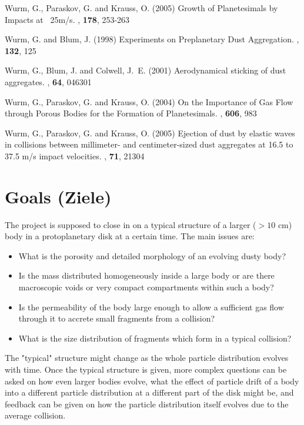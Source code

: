 \begin{ownpubl}
\item Wurm, G., Paraskov, G. and Krauss, O. (2005) Growth of
Planetesimals by Impacts at ~25m/s. \ica, \textbf{178}, 253-263

\item Wurm, G. and Blum, J. (1998) Experiments on Preplanetary
Dust Aggregation. \ica, \textbf{132}, 125

\item Wurm, G., Blum, J. and Colwell, J.~E. (2001) Aerodynamical
sticking of dust aggregates. \phre, \textbf{64}, 046301

\item Wurm, G., Paraskov, G. and Krauss, O. (2004) On the
Importance of Gas Flow through Porous Bodies for the Formation of
Planetesimals. \apj, \textbf{606}, 983

\item Wurm, G., Paraskov, G. and Krauss, O. (2005) Ejection of
dust by elastic waves in collisions between millimeter- and
centimeter-sized dust aggregates at 16.5 to 37.5 m/s impact
velocities. \phre, \textbf{71}, 21304
\end{ownpubl}
%
\section{Goals (Ziele)}
\noindent The project is supposed to close in on a typical structure of a
larger ($> 10$ cm) body in a protoplanetary disk at a certain
time. The main issues are:

\begin{itemize}
\item What is the porosity and detailed morphology of an evolving dusty body?

\item Is the mass distributed homogeneously inside a large body or
are there macroscopic voids or very compact compartments within
such a body?

\item Is the permeability of the body large enough to allow a
sufficient gas flow through it to accrete small fragments from a
collision?

\item What is the size distribution of fragments which form 
in a typical collision?
\end{itemize}

\noindent The "typical" structure might change as the whole particle
distribution evolves with time. Once the typical structure is
given, more complex questions can be asked on how even larger
bodies evolve, what the effect of particle drift of a body into a
different particle distribution at a different part of the disk
might be, and feedback can be given on how the particle
distribution itself evolves due to the average collision.


